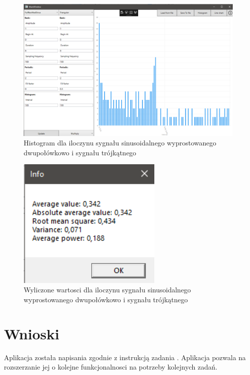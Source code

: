 \documentclass[12pt]{article}
\begin{document}
\begin{figure}[H]
 \centering
 \includegraphics[width=14cm]{images/mulfulltrian1hist.PNG}
 \vspace{-0.3cm}
 \caption{Histogram dla iloczynu sygnału sinusoidalnego wyprostowanego dwupołówkowo i sygnału trójkątnego}
 \label{gui}
\end{figure}

\begin{figure}[H]
 \centering
 \includegraphics[width=7cm]{images/mulfulltrian1info.PNG}
 \vspace{-0.3cm}
 \caption{Wyliczone wartosci dla iloczynu sygnału sinusoidalnego wyprostowanego dwupołówkowo i sygnału trójkątnego}
 \label{gui}
\end{figure}



\newpage

\section{Wnioski}

Aplikacja została napisania zgodnie z instrukcją zadania \cite{zad}. Aplikacja pozwala na rozszerzanie jej o kolejne funkcjonalnosci na potrzeby kolejnych zadań. 
\end{document}
